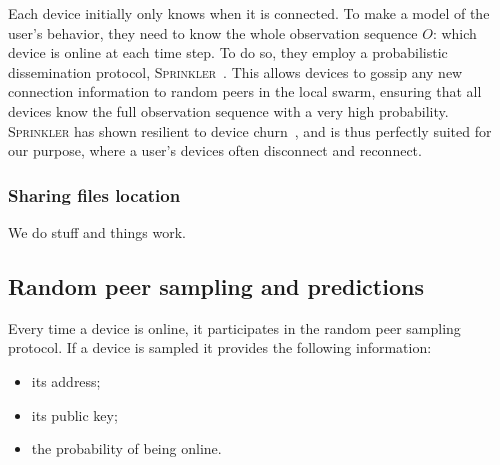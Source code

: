 Each device initially only knows when it is connected. 
To make a model of the user's behavior, they need to know the whole observation sequence $O$: which device is online at each time step.
To do so, they employ a probabilistic dissemination protocol, 
\textsc{Sprinkler}~\cite{luxey:hal-01704172}.
This allows devices to gossip any new connection information to random peers in 
the local swarm, ensuring that all devices know the full observation sequence 
with a very high probability.
\textsc{Sprinkler} has shown resilient to device churn~\cite{luxey:cascade}, and 
is thus perfectly suited for our purpose, where a user's devices often 
disconnect and reconnect. 




\subsubsection{Sharing files location}%
\label{ssub:sharing_files_location}

We do stuff and things work.



\subsection{Random peer sampling and predictions}




Every time a device is online, it participates in the random peer sampling 
protocol.
If a device is sampled it provides the following information:
\begin{itemize}
  \item its address;
	\item its public key;
  \item the probability of being online.
\end{itemize}


